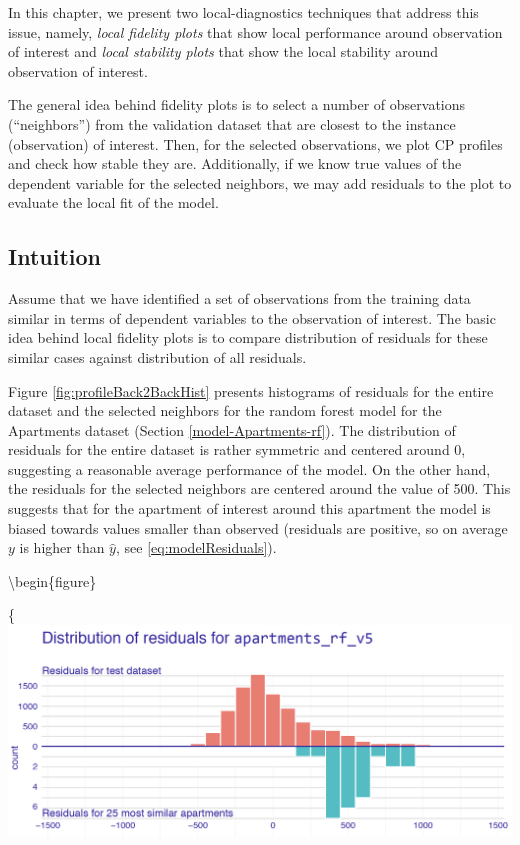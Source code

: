 \documentclass[12pt,]{krantz}
\begin{document}
In this chapter, we present two local-diagnostics techniques that address this issue, namely, \emph{local fidelity plots} that show local performance around observation of interest and \emph{local stability plots} that show the local stability around observation of interest.

The general idea behind fidelity plots is to select a number of observations (``neighbors'') from the validation dataset that are closest to the instance (observation) of interest. Then, for the selected observations, we plot CP profiles and check how stable they are. Additionally, if we know true values of the dependent variable for the selected neighbors, we may add residuals to the plot to evaluate the local fit of the model.

\hypertarget{cPLocDiagIntuition}{%
\subsection{Intuition}\label{cPLocDiagIntuition}}

Assume that we have identified a set of observations from the training data similar in terms of dependent variables to the observation of interest.
The basic idea behind local fidelity plots is to compare distribution of residuals for these similar cases against distribution of all residuals.

Figure \ref{fig:profileBack2BackHist} presents histograms of residuals for the entire dataset and the selected neighbors for the random forest model for the Apartments dataset (Section \ref{model-Apartments-rf}). The distribution of residuals for the entire dataset is rather symmetric and centered around 0, suggesting a reasonable average performance of the model. On the other hand, the residuals for the selected neighbors are centered around the value of 500. This suggests that for the apartment of interest around this apartment the model is biased towards values smaller than observed (residuals are positive, so on average \(y\) is higher than \(\hat y\), see \eqref{eq:modelResiduals}).

\textbackslash{}begin\{figure\}

\{\centering \includegraphics[width=0.8\linewidth]{figure/bb_hist}
\end{document}
